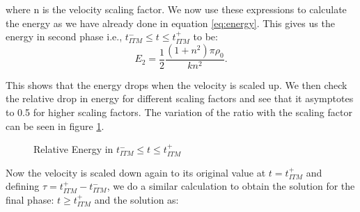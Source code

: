 where n is the velocity scaling factor. We now use these expressions to calculate the energy as we have already done in equation \ref{eq:energy}. This gives us the energy in second phase i.e., $t_{ITM}^- \leq t \leq t_{ITM}^+ $ to be:
\begin{equation}
    E_2 = \frac{1}{2}\frac{\left(1 + n^2\right)\pi \rho_0}{kn^2} .
\end{equation}

This shows that the energy drops when the velocity is scaled up. We then check the relative drop in energy for different scaling factors and see that it asymptotes to 0.5 for higher scaling factors. The variation of the ratio with the scaling factor can be seen in figure \ref{fig:ratio1}.

\begin{figure}
    \centering
    \caption{Relative Energy in $t_{ITM}^- \leq t \leq t_{ITM}^+$}
    \label{fig:ratio1}
\end{figure}

Now the velocity is scaled down again to its original value at $t=t_{ITM}^+$ and defining $\tau = t_{ITM}^+ - t_{ITM}^-$, we do a similar calculation to obtain the solution for the final phase: $t \geq t_{ITM}^+$ and the solution as:

